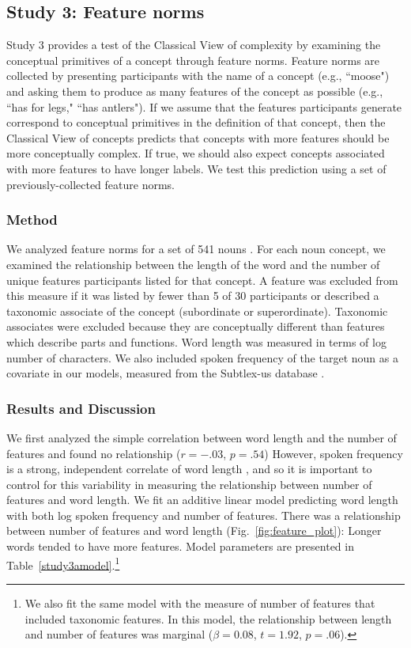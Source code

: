 \subsection{Study 3: Feature norms}
Study 3 provides a test of the Classical View of complexity by examining the conceptual primitives of a concept through feature norms. Feature norms are collected by presenting participants with the name of a concept (e.g., ``moose") and asking them to produce as many features of the concept as possible (e.g., ``has for legs," ``has antlers"). If we assume that the features participants generate correspond to conceptual primitives in the definition of that concept, then the Classical View of concepts predicts that concepts with more  features should be more conceptually complex. If true, we should also expect concepts associated with more features to have longer labels. We test this prediction using a set of previously-collected feature norms.

\subsubsection{Method}
We analyzed feature norms for a set of 541 nouns \cite{mcrae2005semantic}. For each noun concept, we examined the relationship between the length of the word and the number of unique features participants listed for that concept. A feature was excluded from this measure if it was listed by fewer than 5 of 30 participants or described a taxonomic associate of the concept (subordinate or superordinate). Taxonomic associates were excluded because they are conceptually different than features which describe parts and functions. Word length was measured in terms of log number of characters. We also included spoken frequency of the target noun as a covariate in our models, measured from the Subtlex-us database \cite{brysbaert2009moving}. 

\subsubsection{Results and Discussion}
We first analyzed the simple correlation between word length and the number of features and found no relationship ($r=-.03$, $p=.54$)  However, spoken frequency is a strong, independent correlate of word length \cite{zipf1936}, and so it is important to control for this variability in measuring the relationship between number of features and word length. We fit an additive linear model predicting word length with both log spoken frequency and number of features.  There was a  relationship between number of features and word length (Fig.\ \ref{fig:feature_plot}): Longer words tended to have more features. Model parameters are presented in Table~\ref{study3amodel}.\footnote{We also fit the same model with the measure of number of features that included taxonomic features. In this model, the relationship between length and number of features was marginal ($\beta=0.08$, $t =1.92$, $p=.06$).} 


